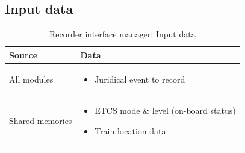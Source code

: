 \documentclass[nocc]{template/openetcs_report}
\begin{document}
\subsection{Input data}
			\begin{longtable}{|l|l|}
				\caption{Recorder interface manager: Input data}\\ 
				\hline
				
					\begin{minipage}[t]{0.35\linewidth} \textbf{Source}	\end{minipage} 
				&	\begin{minipage}[t]{0.65\linewidth} \textbf{Data} \end{minipage} \\
				
				\hline
																																									
					\begin{minipage}[t]{0.35\linewidth} All modules	\end{minipage} 
				&	\begin{minipage}[t]{0.65\linewidth}
						\begin{itemize}
							\item Juridical event to record
						\end{itemize}
					\end{minipage} \\
				
				\hline
				
					\begin{minipage}[t]{0.35\linewidth} Shared memories	\end{minipage} 
				&	\begin{minipage}[t]{0.65\linewidth}
						\begin{itemize}
							\item ETCS mode \& level (on-board status)
							\item Train location data
						\end{itemize}				
					\end{minipage} \\
				
				\hline	
			\end{longtable}	
\end{document}
